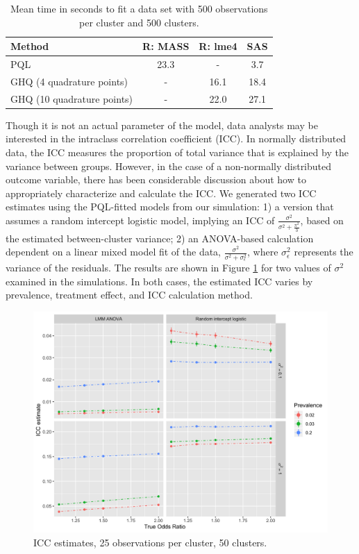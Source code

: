 \documentclass[Afour,times,sagev,doublespace]{sagej}
\begin{document}
\begin{table}[h]
\centering
 \begin{tabular}{l | c c c} 
 Method & R: MASS & R: lme4 & SAS \\ 
 \hline
 PQL & 23.3 & - & 3.7 \\ 
 GHQ (4 quadrature points) & - & 16.1 &  18.4 \\
 GHQ (10 quadrature points) & - & 22.0 &  27.1 \\ 
 \end{tabular}
    \caption{Mean time in seconds to fit a data set with 500 observations per cluster and 500 clusters.}
    \label{tab:method_speed}
\end{table}

Though it is not an actual parameter of the model, data analysts may be interested in the intraclass correlation coefficient (ICC). In normally distributed data, the ICC measures the proportion of total variance that is explained by the variance between groups. However, in the case of a non-normally distributed outcome variable, there has been considerable discussion about how to appropriately characterize and calculate the ICC\cite{wu_comparison_2012}\cite{nakagawa_shinichi_coefficient_2017}. We generated two ICC estimates using the PQL-fitted models from our simulation: 1) a version that assumes a random intercept logistic model, implying an ICC of $\frac{\sigma^2}{\sigma^2+\frac{\pi^2}{3}}$, based on the estimated between-cluster variance\cite{wu_comparison_2012}; 2) an ANOVA-based calculation dependent on a linear mixed model fit of the data, $\frac{\sigma^2}{\sigma^2+\sigma^2_{\epsilon}}$, where $\sigma^2_{\epsilon}$ represents the variance of the residuals\cite{wu_comparison_2012}. The results are shown in Figure \ref{fig:_icc} for two values of $\sigma^2$ examined in the simulations. In both cases, the estimated ICC varies by prevalence, treatment effect, and ICC calculation method.

\begin{figure}[]
\centering
\includegraphics[width=\linewidth]{_icc_p25_n50v2.png}
  \caption{ICC estimates, 25 observations per cluster, 50 clusters.}
    \label{fig:_icc}
\end{figure}
\end{document}
